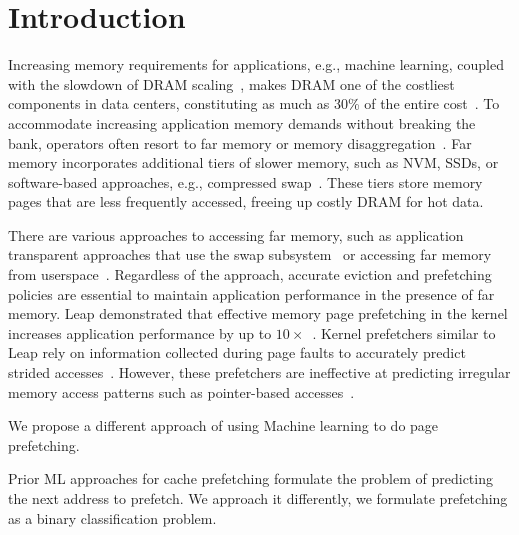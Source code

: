 \section{Introduction}
Increasing memory requirements for applications, e.g., machine learning, coupled with the slowdown of DRAM scaling~\cite{dram-1, dram-2}, makes DRAM one of the costliest components in data centers, constituting as much as 30\% of the entire cost~\cite{meta}. To accommodate increasing application memory demands without breaking the bank, operators often resort to far memory or memory disaggregation~\cite{aifm, canvas, dilos, fastswap, google, infiniswap, leap, memliner}. 
Far memory incorporates additional tiers of slower memory, such as NVM, SSDs, or software-based approaches, e.g., compressed swap~\cite{zswap-1, google, meta}. These tiers store memory pages that are less frequently accessed, freeing up costly DRAM for hot data.


There are various approaches to accessing far memory, such as application transparent approaches that use the swap subsystem~\cite{canvas, google, meta, fastswap, leap} or accessing far memory from userspace~\cite{aifm, hemem}. Regardless of the approach, accurate eviction and prefetching policies are essential to maintain application performance in the presence of far memory.
Leap demonstrated that effective memory page prefetching in the kernel increases application performance by up to $10 \times$~\cite{leap}. 
Kernel prefetchers similar to Leap rely on information collected during page faults to accurately predict strided accesses~\cite{vma-readahead, vm_fault_readahead, leap}. However, these prefetchers are ineffective at predicting irregular memory access patterns such as pointer-based accesses~\cite{CP, canvas, dilos}.

We propose a different approach of using Machine learning to do page prefetching.

Prior ML approaches for cache prefetching formulate the problem of predicting the next address to prefetch. We approach it differently, we formulate prefetching as a binary classification problem. 

